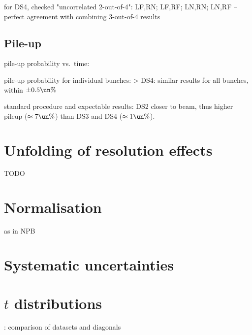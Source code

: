 \> for DS4, checked "uncorrelated 2-out-of-4": LF,RN; LF,RF; LN,RN; LN,RF -- perfect agreement with combining 3-out-of-4 results

\subsection{Pile-up}

\> pile-up probability vs.~time: 

\> pile-up probability for individual bunches: 
\>> DS4: similar results for all bunches, within $\pm 0.5\un{\%}$

\> standard procedure and expectable results: DS2 closer to beam, thus higher pileup ($\approx 7\un{\%}$) than DS3 and DS4
($\approx 1\un{\%}$).
\fi




\section{Unfolding of resolution effects}

TODO

\section{Normalisation}

\> as in NPB

\section{Systematic uncertainties}



\section{$t$ distributions}


\> : comparison of datasets and diagonals





\bye

